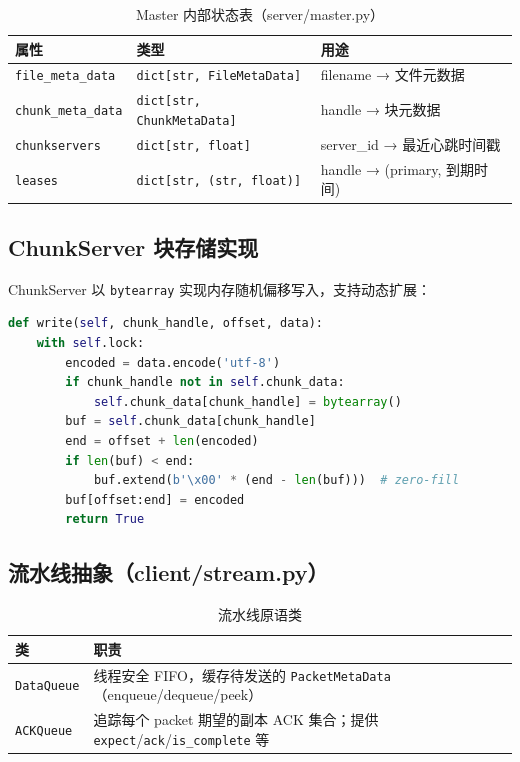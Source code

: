 \documentclass[10pt,a4paper]{article}
\begin{document}
\begin{table}[H]
\centering
\caption{Master 内部状态表（server/master.py）}
\begin{tabularx}{\textwidth}{llX}
\toprule
\textbf{属性} & \textbf{类型} & \textbf{用途} \\
\midrule
\texttt{file\_meta\_data}  & \texttt{dict[str, FileMetaData]}  & filename → 文件元数据 \\
\texttt{chunk\_meta\_data} & \texttt{dict[str, ChunkMetaData]} & handle → 块元数据 \\
\texttt{chunkservers}      & \texttt{dict[str, float]}         & server\_id → 最近心跳时间戳 \\
\texttt{leases}            & \texttt{dict[str, (str, float)]}  & handle → (primary, 到期时间) \\
\bottomrule
\end{tabularx}
\end{table}

\subsection{ChunkServer 块存储实现}

ChunkServer 以 \texttt{bytearray} 实现内存随机偏移写入，支持动态扩展：

\begin{lstlisting}[language=Python, caption={ChunkServer.write（server/chunkserver.py）}]
def write(self, chunk_handle, offset, data):
    with self.lock:
        encoded = data.encode('utf-8')
        if chunk_handle not in self.chunk_data:
            self.chunk_data[chunk_handle] = bytearray()
        buf = self.chunk_data[chunk_handle]
        end = offset + len(encoded)
        if len(buf) < end:
            buf.extend(b'\x00' * (end - len(buf)))  # zero-fill
        buf[offset:end] = encoded
        return True
\end{lstlisting}

\subsection{流水线抽象（client/stream.py）}

\begin{table}[H]
\centering
\caption{流水线原语类}
\begin{tabularx}{\textwidth}{lX}
\toprule
\textbf{类} & \textbf{职责} \\
\midrule
\texttt{DataQueue} & 线程安全 FIFO，缓存待发送的 \texttt{PacketMetaData}（enqueue/dequeue/peek）\\
\texttt{ACKQueue}  & 追踪每个 packet 期望的副本 ACK 集合；提供 \texttt{expect}/\texttt{ack}/\texttt{is\_complete} 等 \\
\bottomrule
\end{tabularx}
\end{table}
\end{document}

